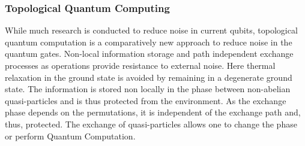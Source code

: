 \documentclass[Master]{subfiles}
\begin{document}
\subsubsection{Topological Quantum Computing}
While much research is conducted to reduce noise in current qubits, topological quantum computation is a comparatively new approach to reduce noise in the quantum gates. Non-local information storage and path independent exchange processes as operations provide resistance to external noise. Here thermal relaxation in the ground state is avoided by remaining in a degenerate ground state. The information is stored non locally in the phase between non-abelian quasi-particles and is thus protected from the environment. As the exchange phase depends on the permutations, it is independent of the exchange path and, thus, protected. The exchange of quasi-particles allows one to change the phase or perform Quantum Computation. 
\end{document}
